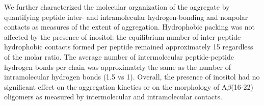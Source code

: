 We further characterized the molecular organization of the aggregate by quantifying peptide inter- and intramolecular hydrogen-bonding and nonpolar contacts as measures of the extent of aggregation.  Hydrophobic packing was not affected by the presence of inositol: the equilibrium number of inter-peptide hydrophobic contacts formed per peptide remained approximately 15 regardless of the molar ratio.  %
The average number of intermolecular peptide-peptide hydrogen bonds per chain was approximately the same as the number of intramolecular hydrogen bonds (1.5 vs 1). 
Overall, the presence of inositol had no significant effect on the aggregation kinetics or on the morphology of A$\beta$(16-22) oligomers as measured by intermolecular and intramolecular contacts. 

